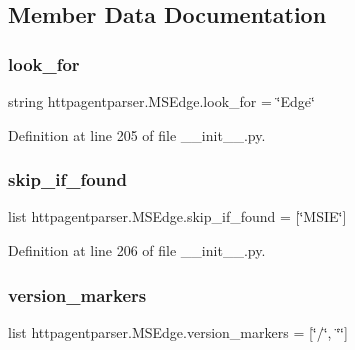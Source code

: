 \subsection{Member Data Documentation}
\hypertarget{classhttpagentparser_1_1_m_s_edge_a21d1e6b38ececc0536e2530f0acec6ba}{}\label{classhttpagentparser_1_1_m_s_edge_a21d1e6b38ececc0536e2530f0acec6ba} 
\subsubsection{\texorpdfstring{look\+\_\+for}{look\_for}}
{\footnotesize\ttfamily string httpagentparser.\+M\+S\+Edge.\+look\+\_\+for = \char`\"{}Edge\char`\"{}\hspace{0.3cm}{\ttfamily [static]}}



Definition at line 205 of file \+\_\+\+\_\+init\+\_\+\+\_\+.\+py.

\hypertarget{classhttpagentparser_1_1_m_s_edge_a777a004e130aab8c9eefbad51cf8a8f5}{}\label{classhttpagentparser_1_1_m_s_edge_a777a004e130aab8c9eefbad51cf8a8f5} 
\subsubsection{\texorpdfstring{skip\+\_\+if\+\_\+found}{skip\_if\_found}}
{\footnotesize\ttfamily list httpagentparser.\+M\+S\+Edge.\+skip\+\_\+if\+\_\+found = \mbox{[}\char`\"{}M\+S\+IE\char`\"{}\mbox{]}\hspace{0.3cm}{\ttfamily [static]}}



Definition at line 206 of file \+\_\+\+\_\+init\+\_\+\+\_\+.\+py.

\hypertarget{classhttpagentparser_1_1_m_s_edge_aafd0b35d008b5710d033ae445c523e66}{}\label{classhttpagentparser_1_1_m_s_edge_aafd0b35d008b5710d033ae445c523e66} 
\subsubsection{\texorpdfstring{version\+\_\+markers}{version\_markers}}
{\footnotesize\ttfamily list httpagentparser.\+M\+S\+Edge.\+version\+\_\+markers = \mbox{[}\char`\"{}/\char`\"{}, \char`\"{}\char`\"{}\mbox{]}\hspace{0.3cm}{\ttfamily [static]}}



